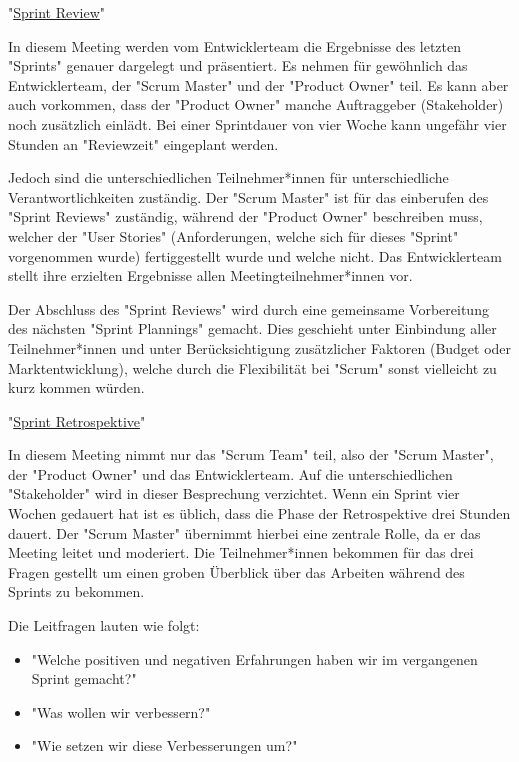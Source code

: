 "\underline{Sprint Review}"

In diesem Meeting werden vom Entwicklerteam die Ergebnisse des letzten "Sprints" genauer dargelegt und präsentiert. Es nehmen für gewöhnlich das Entwicklerteam, der "Scrum Master" und der "Product Owner" teil. Es kann aber auch vorkommen, dass der "Product Owner" manche Auftraggeber (Stakeholder) noch zusätzlich einlädt. Bei einer Sprintdauer von vier Woche kann ungefähr vier Stunden an "Reviewzeit" eingeplant werden. \cite{SprintReview}

Jedoch sind die unterschiedlichen Teilnehmer*innen für unterschiedliche Verantwortlichkeiten zuständig. Der "Scrum Master" ist für das einberufen des "Sprint Reviews" zuständig, während der "Product Owner" beschreiben muss, welcher der "User Stories" (Anforderungen, welche sich für dieses "Sprint" vorgenommen wurde) fertiggestellt wurde und welche nicht. Das Entwicklerteam stellt ihre erzielten Ergebnisse allen Meetingteilnehmer*innen vor. \cite{SprintReview}

Der Abschluss des "Sprint Reviews" wird durch eine gemeinsame Vorbereitung des nächsten "Sprint Plannings" gemacht. Dies geschieht unter Einbindung aller Teilnehmer*innen und unter Berücksichtigung zusätzlicher Faktoren (Budget oder Marktentwicklung), welche durch die Flexibilität bei "Scrum" sonst vielleicht zu kurz kommen würden. \cite{SprintReview}

"\underline{Sprint Retrospektive}"

In diesem Meeting nimmt nur das "Scrum Team" teil, also der "Scrum Master", der "Product Owner" und das Entwicklerteam. Auf die unterschiedlichen "Stakeholder" wird in dieser Besprechung verzichtet. Wenn ein Sprint vier Wochen gedauert hat ist es üblich, dass die Phase der Retrospektive drei Stunden dauert. Der "Scrum Master" übernimmt hierbei eine zentrale Rolle, da er das Meeting leitet und moderiert. Die Teilnehmer*innen bekommen für das drei Fragen gestellt um einen groben Überblick über das Arbeiten während des Sprints zu bekommen. \cite{SprintRetrospektive}

Die Leitfragen lauten wie folgt:

\begin{itemize}
    \item "Welche positiven und negativen Erfahrungen haben wir im vergangenen Sprint gemacht?" \cite{SprintRetrospektive}
    \item "Was wollen wir verbessern?" \cite{SprintRetrospektive}
    \item "Wie setzen wir diese Verbesserungen um?" \cite{SprintRetrospektive}
\end{itemize}
